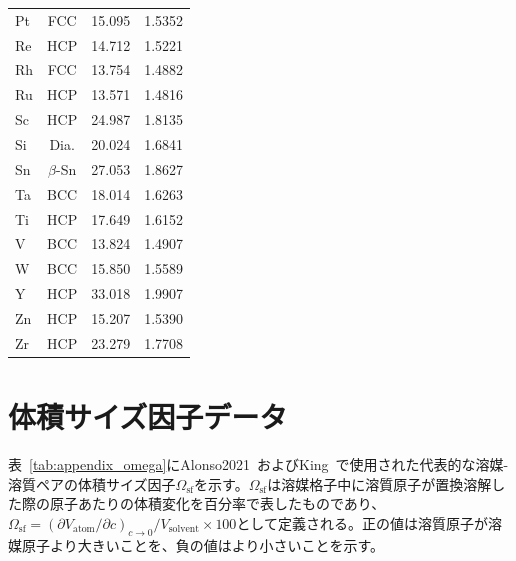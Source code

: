 \documentclass[a4paper,10pt,5p]{elsarticle}
\begin{document}
\begin{table}[htbp]
\begin{tabular}{lccc}
Pt & FCC & 15.095 & 1.5352 \\
Re & HCP & 14.712 & 1.5221 \\
Rh & FCC & 13.754 & 1.4882 \\
Ru & HCP & 13.571 & 1.4816 \\
Sc & HCP & 24.987 & 1.8135 \\
Si & Dia. & 20.024 & 1.6841 \\
Sn & $\beta$-Sn & 27.053 & 1.8627 \\
Ta & BCC & 18.014 & 1.6263 \\
Ti & HCP & 17.649 & 1.6152 \\
V  & BCC & 13.824 & 1.4907 \\
W  & BCC & 15.850 & 1.5589 \\
Y  & HCP & 33.018 & 1.9907 \\
Zn & HCP & 15.207 & 1.5390 \\
Zr & HCP & 23.279 & 1.7708 \\
\hline
\end{tabular}
\end{table}


\section{体積サイズ因子データ}
\label{appendix:omega}

表~\ref{tab:appendix_omega}にAlonso2021~\cite{Alonso2021}およびKing~\cite{king1966}で使用された代表的な溶媒-溶質ペアの体積サイズ因子$\Omega_\mathrm{sf}$を示す。$\Omega_\mathrm{sf}$は溶媒格子中に溶質原子が置換溶解した際の原子あたりの体積変化を百分率で表したものであり、$\Omega_\mathrm{sf} = (\partial V_\mathrm{atom}/\partial c)_{c\to 0} / V_\mathrm{solvent} \times 100$として定義される。正の値は溶質原子が溶媒原子より大きいことを、負の値はより小さいことを示す。
\end{document}
